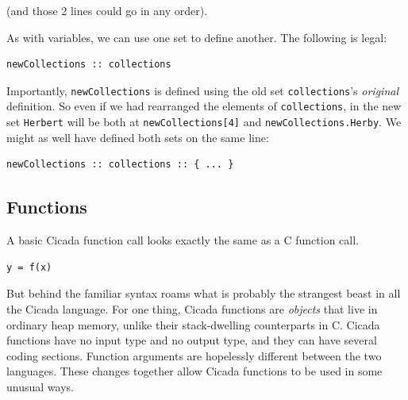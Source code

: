 \documentclass{article}
\newenvironment{code}{
       \begin{list}{}{
               \setlength{\leftmargin}{.4in}
               \setlength{\rightmargin}{0in}
               \setlength{\topsep}{.2in}
       }
       \small
       \item[] }
       { \end{list}   }
\begin{document}
\noindent (and those 2 lines could go in any order).

As with variables, we can use one set to define another.  The following is legal:

\begin{code} \begin{verbatim}
newCollections :: collections
\end{verbatim} \end{code}

\noindent Importantly, \verb#newCollections# is defined using the old set \verb#collections#'s \emph{original} definition.  So even if we had rearranged the elements of \verb#collections#, in the new set \verb#Herbert# will be both at \verb#newCollections[4]# and \verb#newCollections.Herby#.  We might as well have defined both sets on the same line:

\begin{code} \begin{verbatim}
newCollections :: collections :: { ... }
\end{verbatim} \end{code}










\subsection{Functions} 

A basic Cicada function call looks exactly the same as a C function call.

\begin{code} \begin{verbatim}
y = f(x)
\end{verbatim} \end{code}

\noindent But behind the familiar syntax roams what is probably the strangest beast in all the Cicada language.  For one thing, Cicada functions are \emph{objects} that live in ordinary heap memory, unlike their stack-dwelling counterparts in C.  Cicada functions have no input type and no output type, and they can have several coding sections.  Function arguments are hopelessly different between the two languages.  These changes together allow Cicada functions to be used in some unusual ways.
\end{document}
